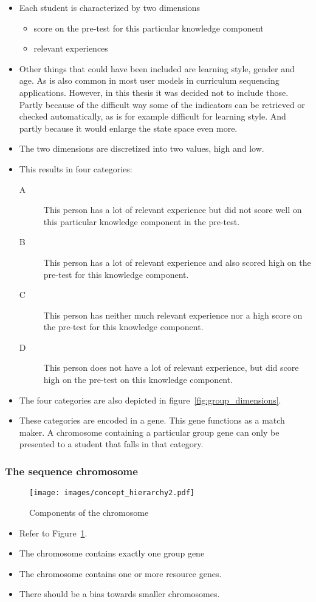 \begin{itemize}
	\item Each student is characterized by two dimensions
		\begin{itemize}
			\item score on the pre-test for this particular knowledge component
			\item relevant experiences
		\end{itemize}
	\item Other things that could have been included are learning
		style, gender and age. As is also common in most user models in
		curriculum sequencing applications. However, in this thesis it
		was decided not to include those. Partly because of the
		difficult way some of the indicators can be retrieved or
		checked automatically, as is for example difficult for learning
		style. And partly because it would enlarge the state space even
		more.
	\item The two dimensions are discretized into two values, high and low.
	\item This results in four categories:
		\begin{description}
			\item[A] This person has a lot of relevant experience but did not
				score well on this particular knowledge component in the
				pre-test.
			\item[B] This person has a lot of relevant experience and also
				scored high on the pre-test for this knowledge component.
			\item[C] This person has neither much relevant experience nor
				a high score on the pre-test for this knowledge component.
			\item[D] This person does not have a lot of relevant experience,
				but did score high on the pre-test on this knowledge component.
		\end{description}
	\item The four categories are also depicted in figure~\ref{fig:group_dimensions}.
	\item These categories are encoded in a gene. This gene functions as a
		match maker. A chromosome containing a particular group gene can only
		be presented to a student that falls in that category.
\end{itemize}
\subsubsection{The sequence chromosome}
\begin{figure}[h!]
	\centering
	\texttt{[image: images/concept\_hierarchy2.pdf]}
	\caption[Components of the chromosome]{Components of the chromosome}
	\label{fig:chromosome_components}
\end{figure}
\begin{itemize}
	\item Refer to Figure~\ref{fig:chromosome_components}.
	\item The chromosome contains exactly one group gene
	\item The chromosome contains one or more resource genes.
	\item There should be a bias towards smaller chromosomes.
\end{itemize}

